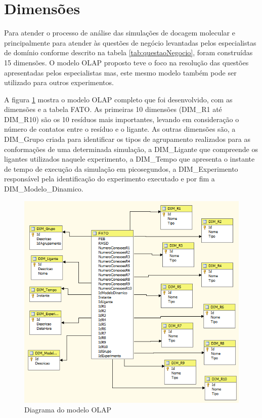 
\section{Dimensões}
\label{sec:Dimensoes}

Para atender o processo de análise das simulações de docagem molecular e principalmente para atender às questões de negócio levantadas pelos especialistas de domínio conforme descrito na tabela \ref{tab:questaoNegocio}, foram construídas 15 dimensões. O modelo OLAP proposto teve o foco na resolução das questões apresentadas pelos especialistas mas, este mesmo modelo também pode ser utilizado para outros experimentos.

A figura \ref{fig:DiagModeloOLAP} mostra o modelo OLAP completo que foi desenvolvido, com as dimensões e a tabela FATO. As primeiras 10 dimensões (DIM\_R1 até DIM\_R10) são os 10 resíduos mais importantes, levando em consideração o número de contatos entre o resíduo e o ligante. As outras dimensões são, a DIM\_Grupo criada para identificar os tipos de agrupamento realizados para as conformações de uma determinada simulação, a DIM\_Ligante que compreende os ligantes utilizados naquele experimento, a DIM\_Tempo que apresenta o instante de tempo de execução da simulação em picosegundos, a DIM\_Experimento responsável pela identificação do experimento executado e por fim a DIM\_Modelo\_Dinamico.

\begin{figure}[h]
        \center
        \includegraphics[scale=0.7]{images/ModelagemOLAP.PNG}
        \caption{Diagrama do modelo OLAP}
        \label{fig:DiagModeloOLAP}
\end{figure}

